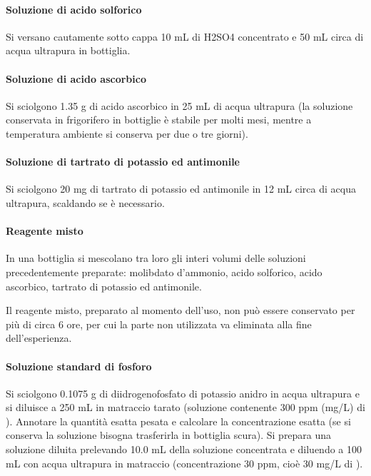 \paragraph{Soluzione di acido solforico}
Si versano cautamente sotto cappa 10 mL di H2SO4 concentrato e 50 mL circa di acqua ultrapura in bottiglia.

\paragraph{Soluzione di acido ascorbico}
Si sciolgono 1.35 g di acido ascorbico in 25 mL di acqua ultrapura (la soluzione conservata in frigorifero in bottiglie è stabile per molti mesi, mentre a temperatura ambiente si conserva per due o tre giorni).

\paragraph{Soluzione di tartrato di potassio ed antimonile}
Si sciolgono 20 mg di tartrato di potassio ed antimonile in 12 mL circa di acqua ultrapura, scaldando se è necessario.

\paragraph{Reagente misto}
In una bottiglia si mescolano tra loro gli interi volumi delle soluzioni precedentemente preparate: molibdato d'ammonio, acido solforico, acido ascorbico, tartrato di potassio ed antimonile.

Il reagente misto, preparato al momento dell'uso, non può essere conservato per più di circa 6 ore, per cui la parte non utilizzata va eliminata alla fine dell'esperienza.

\paragraph{Soluzione standard di fosforo}

Si sciolgono 0.1075 g di diidrogenofosfato di potassio anidro in acqua ultrapura e si diluisce a 250 mL in matraccio tarato (soluzione contenente 300 ppm (mg/L) di ). Annotare la quantità esatta pesata e calcolare la concentrazione esatta (se si conserva la soluzione bisogna trasferirla in bottiglia scura). Si prepara una soluzione diluita prelevando 10.0 mL della soluzione concentrata e diluendo a 100 mL con acqua ultrapura in matraccio (concentrazione 30 ppm, cioè 30 mg/L di ).

